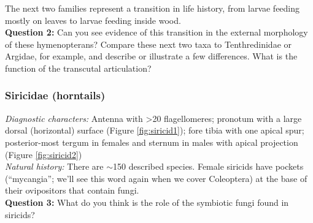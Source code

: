 \documentclass[letterpaper, 11pt]{article}
\begin{document}
\noindent{}The next two families represent a transition in life history, from larvae feeding mostly on leaves to larvae feeding inside wood. \\

\noindent\textbf{Question 2:} Can you see evidence of this transition in the external morphology of these hymenopterans? Compare these next two taxa to Tenthredinidae or Argidae, for example, and describe or illustrate a few differences. What is the function of the transcutal articulation?\vspace{3cm}

\subsubsection{Siricidae (horntails)}
\noindent{}\textit{Diagnostic characters:} Antenna with \textgreater{}20 flagellomeres; pronotum with a large dorsal (horizontal) surface (Figure \ref{fig:siricid1}); fore tibia with one apical spur; posterior-most tergum in females and sternum in males with apical projection (Figure \ref{fig:siricid2})\\

\noindent{}\textit{Natural history:} There are $\sim$150 described species. Female siricids have pockets (``mycangia''; we'll see this word again when we cover Coleoptera) at the base of their ovipositors that contain fungi. \\

\noindent\textbf{Question 3:} What do you think is the role of the symbiotic fungi found in siricids?\vspace{1.5cm}
\end{document}
